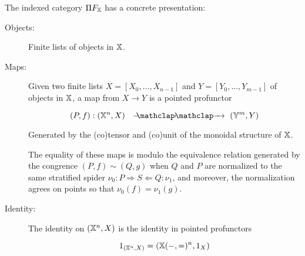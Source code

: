 \begin{lemma}
The indexed category $\Pi F_{\mathbb{X}}$ has a concrete presentation:

\begin{description}
\item[Objects:] Finite lists of objects in $\mathbb{X}$.
%
%
%

\item[Maps:] Given two finite lists $X=[X_0,\ldots, X_{n-1}]$ and $Y=[Y_0,\ldots, Y_{m-1}]$ of objects in $\mathbb{X}$, a map from $X\to Y$ is a pointed profunctor

$$
(P,f): (\X^n,X) \proarrow (\Y^m,Y)
$$

Generated by the (co)tensor and (co)unit of the monoidal structure of $\mathbb{X}$.

The equality of these maps is modulo the equivalence relation generated by the congrence
$(P,f)\sim(Q,g)$
 when $Q$ and $P$ are normalized to the same stratified spider $\nu_0:P\Rightarrow S \Leftarrow Q:\nu_1$, and moreover, the normalization agrees on points so that $\nu_0(f)=\nu_1(g)$.
%

\item[Identity:]  The identity on $(\mathbb{X}^n,X)$ is the identity in pointed profunctors

$$
1_{(\mathbb{X}^n,X)} = (\mathbb{X}(-,=)^n,1_X)
$$



\end{description}
\end{lemma}
